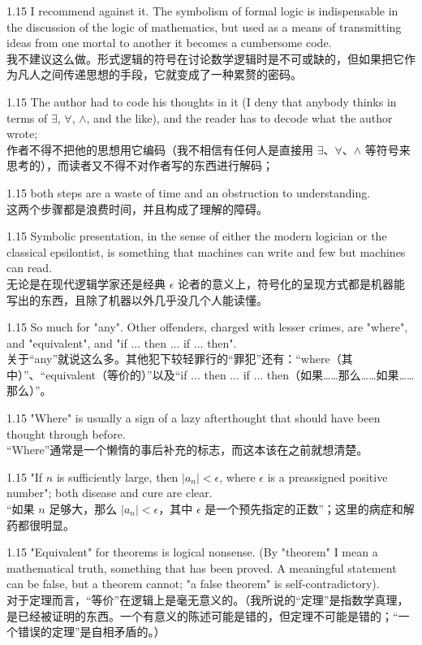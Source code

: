 \documentclass[12pt,a4paper]{article}
\newcommand{\bilingual}[2]{
    \begin{spacing}{1.15} %
        \noindent \normalsize #1 \\[-0.5ex] %
        \small \textcolor{blue!70!black}{#2} %
    \end{spacing}
    \vspace{0.8em} %
}
\begin{document}
\bilingual{I recommend against it. The symbolism of formal logic is indispensable in the discussion of the logic of mathematics, but used as a means of transmitting ideas from one mortal to another it becomes a cumbersome code.}
{我不建议这么做。形式逻辑的符号在讨论数学逻辑时是不可或缺的，但如果把它作为凡人之间传递思想的手段，它就变成了一种累赘的密码。} %

\bilingual{The author had to code his thoughts in it (I deny that anybody thinks in terms of $\exists$, $\forall$, $\land$, and the like), and the reader has to decode what the author wrote;}
{作者不得不把他的思想用它编码（我不相信有任何人是直接用 $\exists$、$\forall$、$\land$ 等符号来思考的），而读者又不得不对作者写的东西进行解码；} %

\bilingual{both steps are a waste of time and an obstruction to understanding.}
{这两个步骤都是浪费时间，并且构成了理解的障碍。} %

\bilingual{Symbolic presentation, in the sense of either the modern logician or the classical epsilontist, is something that machines can write and few but machines can read.}
{无论是在现代逻辑学家还是经典 $\epsilon$ 论者的意义上，符号化的呈现方式都是机器能写出的东西，且除了机器以外几乎没几个人能读懂。} %

\bilingual{So much for "any". Other offenders, charged with lesser crimes, are "where", and "equivalent", and "if ... then ... if ... then".}
{关于“any”就说这么多。其他犯下较轻罪行的“罪犯”还有：“where（其中）”、“equivalent（等价的）”以及“if ... then ... if ... then（如果……那么……如果……那么）”。} %

\bilingual{"Where" is usually a sign of a lazy afterthought that should have been thought through before.}
{“Where”通常是一个懒惰的事后补充的标志，而这本该在之前就想清楚。} %

\bilingual{"If $n$ is sufficiently large, then $|a_{n}|<\epsilon$, where $\epsilon$ is a preassigned positive number"; both disease and cure are clear.}
{“如果 $n$ 足够大，那么 $|a_{n}|<\epsilon$，其中 $\epsilon$ 是一个预先指定的正数”；这里的病症和解药都很明显。} %

\bilingual{"Equivalent" for theorems is logical nonsense. (By "theorem" I mean a mathematical truth, something that has been proved. A meaningful statement can be false, but a theorem cannot; "a false theorem" is self-contradictory).}
{对于定理而言，“等价”在逻辑上是毫无意义的。（我所说的“定理”是指数学真理，是已经被证明的东西。一个有意义的陈述可能是错的，但定理不可能是错的；“一个错误的定理”是自相矛盾的。）} %
\end{document}
